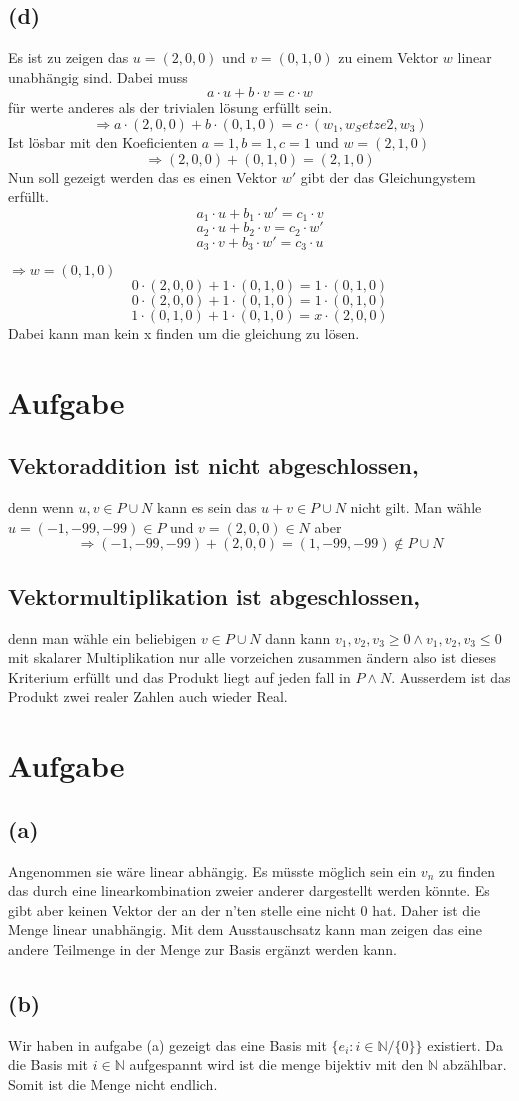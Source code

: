 \documentclass{article}
\begin{document}
\subsection*{(d)} Es ist zu zeigen das \(u = (2, 0, 0)\) und \(v = (0, 1, 0)\) zu einem Vektor \(w\) linear unabhängig sind. Dabei muss
\[a \cdot u + b \cdot v = c \cdot w\]
für werte anderes als der trivialen lösung erfüllt sein.
\[ \Rightarrow a \cdot (2,0,0) + b \cdot (0,1,0) = c \cdot (w_1, w_Setze2, w_3)\]
Ist lösbar mit den Koeficienten \(a = 1, b = 1, c = 1\) und \(w = (2, 1, 0)\)
\[ \Rightarrow  (2,0,0) + (0,1,0) = (2, 1, 0)\]
Nun soll gezeigt werden das es einen Vektor \(w'\) gibt der das Gleichungystem erfüllt.
\[a_1 \cdot u + b_1 \cdot w' = c_1 \cdot v\]
\[a_2 \cdot u + b_2 \cdot v = c_2 \cdot w'\]
\[a_3 \cdot v + b_3 \cdot w' = c_3 \cdot u\]

\(\Rightarrow w = (0, 1, 0)\)
\[0 \cdot (2,0,0) + 1 \cdot (0,1,0) = 1 \cdot (0,1,0)\]
\[0 \cdot (2,0,0) + 1 \cdot (0,1,0) = 1 \cdot (0, 1,0)\]
\[1 \cdot (0,1,0) + 1 \cdot (0,1,0) = x \cdot (2,0,0) 
\]
Dabei kann man kein x finden um die gleichung zu lösen.

\section{Aufgabe}
\subsection*{Vektoraddition ist nicht abgeschlossen, } denn wenn \(u,v \in P \cup N\) kann es sein das \(u + v \in P \cup N\) nicht gilt. Man wähle \(u = (-1, -99, -99) \in P\) und \(v = (2, 0, 0) \in N\)
aber 
\[\Rightarrow (-1, -99, -99) + (2, 0, 0) = (1,-99, -99)\not \in P\cup N\]
\subsection*{Vektormultiplikation ist abgeschlossen,} denn man wähle ein beliebigen \(v \in P \cup N\) dann kann \(v_1, v_2, v_3 \geq 0 \wedge v_1, v_2, v_3 \leq 0\) mit skalarer Multiplikation nur alle vorzeichen zusammen ändern also ist dieses Kriterium erfüllt und das Produkt liegt auf jeden fall in \(P \wedge N\). Ausserdem ist das Produkt zwei realer Zahlen auch wieder Real. 

\section{Aufgabe}
\subsection*{(a)} Angenommen sie wäre linear abhängig. Es müsste möglich sein ein \(v_n\) zu finden das durch eine linearkombination zweier anderer dargestellt werden könnte. Es gibt aber keinen Vektor der an der n'ten stelle eine nicht 0 hat. Daher ist die Menge linear unabhängig. Mit dem Ausstauschsatz kann man zeigen das eine andere Teilmenge in der Menge zur Basis ergänzt werden kann.
\subsection*{(b)} Wir haben in aufgabe (a) gezeigt das eine Basis mit \(\{e_i : i \in \mathbb{N} / \{0\}\}\) existiert. Da die Basis mit \(i \in \mathbb{N}\) aufgespannt wird ist die menge bijektiv mit den \(\mathbb{N}\) abzählbar. Somit ist die Menge nicht endlich.
\end{document}
